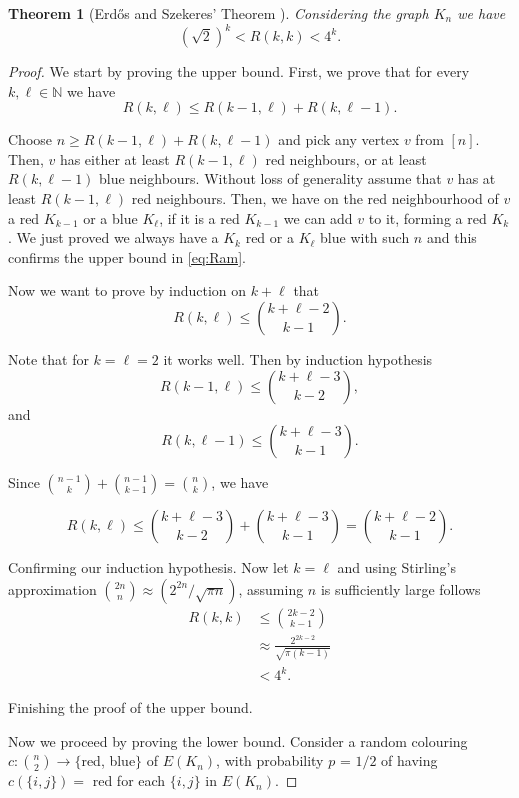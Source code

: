 \documentclass[12pt,twoside,a4paper,bibliography=totocnumbered]{book}
\numberwithin{equation}{section}
\newtheorem{theorem}             {Theorem}[section]
\theoremstyle{remark}
\begin{document}
\begin{theorem}[{Erd\H{o}s and Szekeres' Theorem \cite{ersz35, Er47}}]\label{thm:ErdosandS}
Considering the graph $K_n$ we have
$$(\sqrt{2})^k < R(k,k) < 4^k.$$
\end{theorem}
\begin{proof} We start by proving the upper bound. First, we prove that for every $k, \ell \in \mathbb{N}$ we have
\begin{equation}\label{eq:Ram}
R(k,\ell ) \leq R(k-1,\ell )+R(k,\ell-1).
\end{equation}

Choose $n \geq R(k-1,\ell) + R(k, \ell-1)$ and pick any vertex $v$ from $[n]$. Then, $v$ has either at least $R(k-1,\ell)$ red neighbours, or at least $R(k,\ell-1)$ blue neighbours. Without loss of generality assume that $v$ has at least $R(k-1,\ell)$ red neighbours. Then, we have on the red neighbourhood of $v$ a red $K_{k-1}$ or a blue $K_{\ell}$, if it is a red $K_{k-1}$ we can add $v$ to it, forming a red $K_k$. We just proved we always have a $K_k$ red or a $K_{\ell}$ blue with such $n$ and this confirms the upper bound in \eqref{eq:Ram}.

Now we want to prove by induction on $k+\ell$ that
$$R(k,\ell) \leq \binom{k+\ell - 2}{k - 1}.$$

Note that for $k = \ell = 2$ it works well. Then by induction hypothesis
$$R(k-1,\ell)\leq \binom{k+\ell -3}{k-2},$$ and $$R(k,\ell-1)\leq \binom{k+\ell-3}{k-1}.$$

Since $\binom{n-1}{k} + \binom{n-1}{k-1} = \binom{n}{k}$, we have

$$R(k,\ell)\leq \binom{k+\ell-3}{k-2} + \binom{k+\ell-3}{k-1} = \binom{k+ \ell -2}{k-1}.$$

Confirming our induction hypothesis. Now let $k = \ell$ and using Stirling's approximation  $\binom{2n}{n} \approx (2^{2n}/\sqrt{\pi n})$, assuming $n$ is sufficiently large follows
\begin{align*}
R(k,k) &\leq \binom{2k -2}{k-1}\\
& \approx \frac{2^{2k-2}}{\sqrt{\pi (k-1)}}\\
& < 4^k.
\end{align*}

Finishing the proof of the upper bound.

Now we proceed by proving the lower bound. Consider a random colouring $c\colon \binom{n}{2} \rightarrow \{$red, blue$\}$ of $E(K_n)$, with probability $p$ = $1/2$ of having $c(\{i,j\}) =$ red for each $\{i,j\}$ in $E(K_n)$.


\end{proof}
\end{document}

